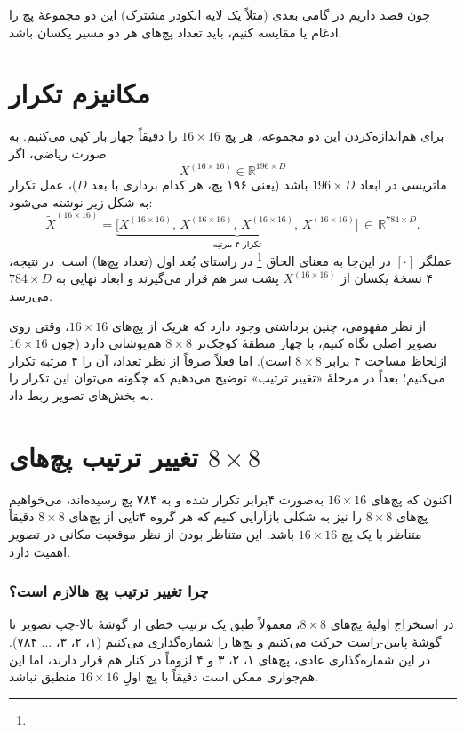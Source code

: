 چون قصد داریم در گامی بعدی (مثلاً یک لایه انکودر مشترک) این دو مجموعهٔ پچ را ادغام یا مقایسه کنیم، باید تعداد پچ‌های هر دو مسیر یکسان باشد.

\section*{مکانیزم تکرار}

برای هم‌اندازه‌کردن این دو مجموعه، هر پچ $16 \times 16$ را دقیقاً چهار بار کپی می‌کنیم. به صورت ریاضی، اگر 
\[
X^{(16\times16)} \in \mathbb{R}^{196 \times D}
\]
ماتریسی در ابعاد $196 \times D$ باشد (یعنی ۱۹۶ پچ، هر کدام برداری با بعد $D$)، عمل تکرار به شکل زیر نوشته می‌شود:
\[
\tilde{X}^{(16\times16)} 
= 
\underbrace{ \bigl[X^{(16\times16)},\, X^{(16\times16)},\, X^{(16\times16)},\, X^{(16\times16)}\bigr] }_{\text{تکرار ۴ مرتبه}}
\, \in\, \mathbb{R}^{784 \times D}.
\]
عملگر \( [\cdot] \) در این‌جا به معنای الحاق \footnote{} در راستای بُعد اول (تعداد پچ‌ها) است. در نتیجه، ۴ نسخهٔ یکسان از \(X^{(16\times16)}\) پشت سر هم قرار می‌گیرند و ابعاد نهایی به \(784 \times D\) می‌رسد.


از نظر مفهومی، چنین برداشتی وجود دارد که هریک از پچ‌های $16 \times 16$، وقتی روی تصویر اصلی نگاه کنیم، با چهار منطقهٔ کوچک‌تر $8 \times 8$ هم‌پوشانی دارد (چون $16\times16$ ازلحاظ مساحت ۴ برابر $8\times8$ است). اما فعلاً صرفاً از نظر تعداد، آن را ۴ مرتبه تکرار می‌کنیم؛ بعداً در مرحلهٔ «تغییر ترتیب» توضیح می‌دهیم که چگونه می‌توان این تکرار را به بخش‌های تصویر ربط داد.


\section*{تغییر ترتیب  پچ‌های $8 \times 8$}

اکنون که پچ‌های $16 \times 16$ به‌صورت ۴برابر تکرار شده و به ۷۸۴ پچ رسیده‌اند، می‌خواهیم پچ‌های $8 \times 8$ را نیز به شکلی بازآرایی کنیم که هر گروه ۴تایی از پچ‌های $8 \times 8$ دقیقاً متناظر با یک پچ $16 \times 16$ باشد. این متناظر بودن از نظر موقعیت مکانی در تصویر اهمیت دارد.

\subsubsection*{چرا تغییر ترتیب پچ هالازم است؟}
در استخراج اولیهٔ پچ‌های $8 \times 8$، معمولاً طبق یک ترتیب خطی  از گوشهٔ بالا-چپ تصویر تا گوشهٔ پایین-راست حرکت می‌کنیم و پچ‌ها را شماره‌گذاری می‌کنیم (۱، ۲، ۳، ... ۷۸۴). در این شماره‌گذاری عادی، پچ‌های ۱، ۲، ۳ و ۴ لزوماً در کنار هم قرار دارند، اما این هم‌جواری ممکن است دقیقاً با پچ اولِ $16 \times 16$ منطبق نباشد.

